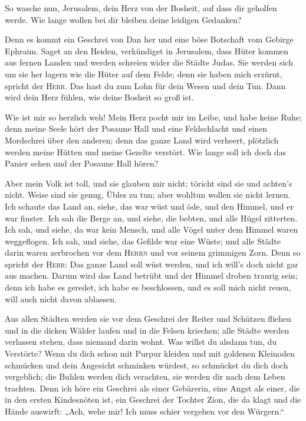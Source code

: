  So wasche nun, Jerusalem, dein Herz von der Bosheit, auf
dass dir geholfen werde. Wie lange wollen bei dir bleiben deine leidigen
Gedanken?

 Denn es kommt ein Geschrei von Dan her und eine böse
Botschaft vom Gebirge Ephraim.  Saget an den Heiden,
verkündiget in Jerusalem, dass Hüter kommen aus fernen Landen und werden
schreien wider die Städte Judas.  Sie werden sich um sie
her lagern wie die Hüter auf dem Felde; denn sie haben mich erzürnt,
spricht der \textsc{Herr}.  Das hast du zum Lohn für dein
Wesen und dein Tun. Dann wird dein Herz fühlen, wie deine Bosheit so
groß ist.

 Wie ist mir so herzlich weh! Mein Herz pocht mir im
Leibe, und habe keine Ruhe; denn meine Seele hört der Posaune Hall und
eine Feldschlacht  und einen Mordschrei über den anderen;
denn das ganze Land wird verheert, plötzlich werden meine Hütten und
meine Gezelte verstört.  Wie lange soll ich doch das
Panier sehen und der Posaune Hall hören?

 Aber mein Volk ist toll, und sie glauben mir nicht;
töricht sind sie und achten's nicht. Weise sind sie genug, Übles zu tun;
aber wohltun wollen sie nicht lernen.  Ich schaute das
Land an, siehe, das war wüst und öde, und den Himmel, und er war
finster.  Ich sah die Berge an, und siehe, die bebten,
und alle Hügel zitterten.  Ich sah, und siehe, da war
kein Mensch, und alle Vögel unter dem Himmel waren weggeflogen.
 Ich sah, und siehe, das Gefilde war eine Wüste; und alle
Städte darin waren zerbrochen vor dem \textsc{Herrn} und vor seinem
grimmigen Zorn.  Denn so spricht der \textsc{Herr}: Das
ganze Land soll wüst werden, und ich will's doch nicht gar aus machen.
 Darum wird das Land betrübt und der Himmel droben
traurig sein; denn ich habe es geredet, ich habe es beschlossen, und es
soll mich nicht reuen, will auch nicht davon ablassen.

 Aus allen Städten werden sie vor dem Geschrei der Reiter
und Schützen fliehen und in die dicken Wälder laufen und in die Felsen
kriechen; alle Städte werden verlassen stehen, dass niemand darin wohnt.
 Was willst du alsdann tun, du Verstörte? Wenn du dich
schon mit Purpur kleiden und mit goldenen Kleinoden schmücken und dein
Angesicht schminken würdest, so schmückst du dich doch vergeblich; die
Buhlen werden dich verachten, sie werden dir nach dem Leben trachten.
 Denn ich höre ein Geschrei als einer Gebärerin, eine
Angst als einer, die in den ersten Kindesnöten ist, ein Geschrei der
Tochter Zion, die da klagt und die Hände auswirft: „Ach, wehe mir! Ich
muss schier vergehen vor den Würgern.``

